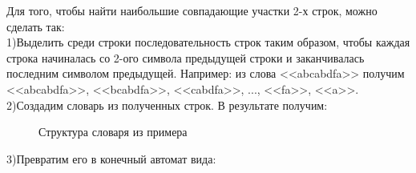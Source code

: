 \documentclass[a4paper,12pt]{article}
\begin{document}
Для того, чтобы найти наибольшие совпадающие участки 2-х строк, можно сделать так:\\
1)Выделить среди строки последовательность строк таким образом, чтобы каждая строка начиналась со 2-ого символа предыдущей строки и заканчивалась последним символом предыдущей. Например: из слова <<abcabdfa>> получим <<abcabdfa>>, <<bcabdfa>>, <<cabdfa>>, ..., <<fa>>, <<a>>.\\
2)Создадим словарь из полученных строк. В результате получим:
\newpage
\begin{figure}[h]
\caption{Структура словаря из примера}
\label{images:automat2}
\end{figure} 
3)Превратим его в конечный автомат вида:
\newpage
\end{document}
